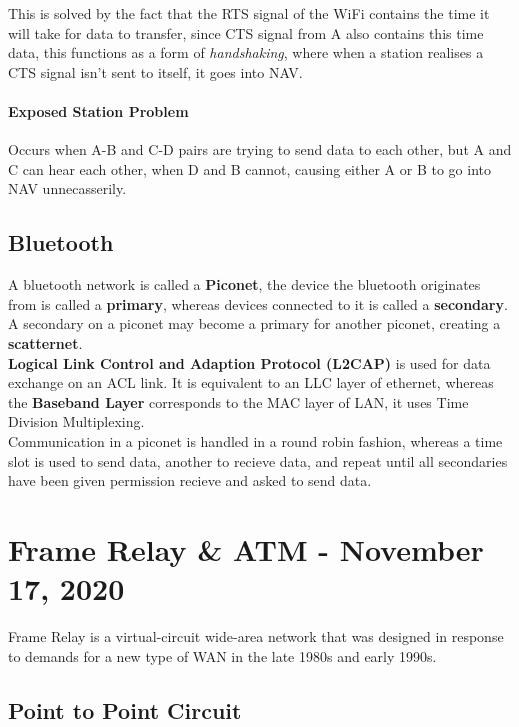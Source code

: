 \documentclass[11pt,a4paper,twoside]{book}
\begin{document}
This is solved by the fact that the RTS signal of the WiFi contains the time it will take for data to transfer, since CTS signal from A also contains this time data, this functions as a form of \textit{handshaking}, where when a station realises a CTS signal isn't sent to itself, it goes into NAV.\\

\subsubsection{Exposed Station Problem}

Occurs when A-B and C-D pairs are trying to send data to each other, but A and C can hear each other, when D and B cannot, causing either A or B to go into NAV unnecasserily.

\section{Bluetooth}

A bluetooth network is called a \textbf{Piconet}, the device the bluetooth originates from is called a \textbf{primary}, whereas devices connected to it is called a \textbf{secondary}. A secondary on a piconet may become a primary for another piconet, creating a \textbf{scatternet}.\\

\textbf{Logical Link Control and Adaption Protocol (L2CAP)} is used for data exchange on an ACL link. It is equivalent to an LLC layer of ethernet, whereas the \textbf{Baseband Layer} corresponds to the MAC layer of LAN, it uses Time Division Multiplexing.\\

Communication in a piconet is handled in a round robin fashion, whereas a time slot is used to send data, another to recieve data, and repeat until all secondaries have been given permission recieve and asked to send data.


\chapter{Frame Relay \& ATM - November 17, 2020}

Frame Relay is a virtual-circuit wide-area network that was designed in response to demands for a new type of WAN in the late 1980s and early 1990s.

\section{Point to Point Circuit}
\end{document}
